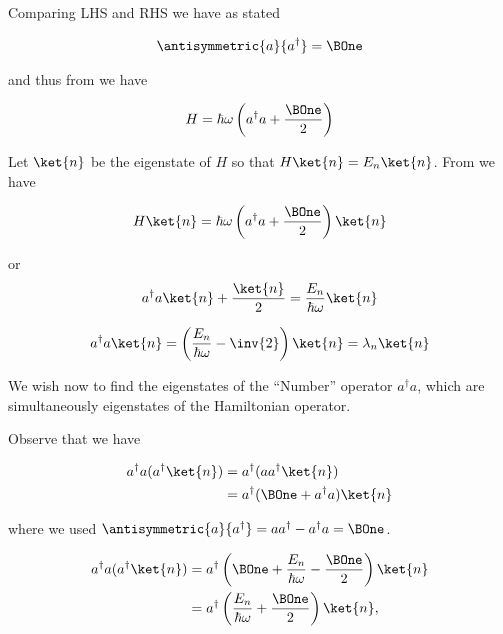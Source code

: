 Comparing LHS and RHS we have as stated

\begin{align}\label{eqn:PHY356FLecture11:40}
\antisymmetric{a}{a^\dagger} = \BOne
\end{align}

and thus from  we have

\begin{equation}\label{eqn:PHY356FLecture11:50}
H = \hbar \omega \left( a^\dagger a + \frac{\BOne}{2} \right)
\end{equation}

Let $\ket{n}$ be the eigenstate of $H$ so that $H\ket{n} = E_n \ket{n}$.  From  we have

\begin{equation}\label{eqn:PHY356FLecture11:60}
H \ket{n}
=
\hbar \omega \left( a^\dagger a + \frac{\BOne}{2} \right) \ket{n}
\end{equation}

or
\begin{equation}\label{eqn:PHY356FLecture11:70}
a^\dagger a \ket{n} + \frac{\ket{n}}{2} = \frac{E_n}{\hbar \omega} \ket{n}
\end{equation}

\begin{equation}\label{eqn:PHY356FLecture11:80}
a^\dagger a \ket{n} = \left( \frac{E_n}{\hbar \omega} - \inv{2} \right) \ket{n} = \lambda_n \ket{n}
\end{equation}

We wish now to find the eigenstates of the ``Number'' operator $a^\dagger a$, which are simultaneously eigenstates of the Hamiltonian operator.

Observe that we have

\begin{align*}
a^\dagger a (a^\dagger \ket{n} )
&= a^\dagger ( a a^\dagger \ket{n} ) \\
&= a^\dagger ( \BOne + a^\dagger a ) \ket{n}
\end{align*}

where we used $\antisymmetric{a}{a^\dagger} = a a^\dagger - a^\dagger a = \BOne$.

\begin{align*}
a^\dagger a (a^\dagger \ket{n} )
&= a^\dagger \left( \BOne + \frac{E_n}{\hbar\omega} - \frac{\BOne}{2} \right) \ket{n} \\
&= a^\dagger \left( \frac{E_n}{\hbar\omega} + \frac{\BOne}{2} \right) \ket{n},
\end{align*}

